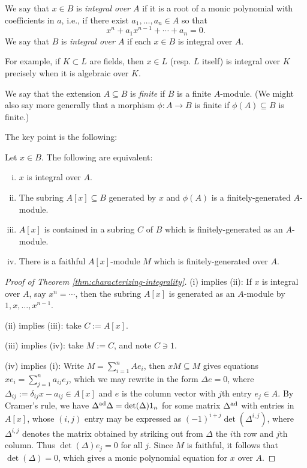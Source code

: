 \documentclass[reqno]{amsart}
\begin{document}
We say that \(x \in B\) is \emph{integral over $A$}
if it is a root of a monic polynomial with coefficients in \(a\),
i.e., if there exist \(a_1,\dotsc,a_n \in A\)
so that
\[
  x^n + a_1 x^{n-1} + \dotsb + a_n = 0.
  \]
We say that \(B\) is \emph{integral over $A$}
if each \(x \in B\) is integral over \(A\).

For example, if \(K \subset L\) are fields, then \(x \in L\)
(resp. \(L\) itself)
is integral
over \(K\) precisely when it is algebraic over \(K\).


We say that the extension \(A \subseteq B\) is \emph{finite} if \(B\) is a finite $A$-module.
(We might also say more generally that a morphism \(\phi : A \rightarrow B\) is finite
if \(\phi(A) \subseteq B\) is finite.)

The key point is the following:
\begin{theorem}\label{thm:characterizing-integrality}
  Let $x \in B$.
  The following are equivalent:
  \begin{enumerate}[(i)]
  \item $x$ is integral over $A$.
  \item The subring $A[x] \subseteq B$
    generated by $x$ and $\phi(A)$
    is a finitely-generated $A$-module.
  \item $A[x]$ is contained in a subring $C$ of $B$
    which is finitely-generated as an $A$-module.
  \item There is a faithful $A[x]$-module $M$
    which is finitely-generated over $A$.
  \end{enumerate}
\end{theorem}

\begin{proof}[Proof of Theorem \ref{thm:characterizing-integrality}]
  (i) implies (ii):
  If $x$ is integral over $A$,
  say $x^n = \dotsb$,
  then the subring $A[x]$ is generated
  as an $A$-module
  by $1, x, \dotsc, x^{n-1}$.

  (ii) implies (iii):
  take $C := A[x]$.

  (iii) implies (iv):
  take $M := C$, and note $C \ni 1$.

  (iv) implies (i):
  Write $M = \sum_{i=1}^n A e_i$,
  then $x M \subseteq M$ gives
  equations
  $x e_i = \sum_{j=1}^n a_{i j} e_j$,
  which we may rewrite in the form
  $\Delta e = 0$,
  where
  $\Delta_{i j} := \delta_{i j} x -  a_{i j} \in A[x]$
  and $e$ is the column vector with $j$th entry $e_j \in A$.
  By Cramer's rule, we have
  $\Delta^{\operatorname{ad}} \Delta = \det(\Delta) 1_n$
  for some matrix $\Delta^{\operatorname{ad}}$ with entries in $A[x]$,
  whose $(i,j)$ entry
  may be expressed as $(-1)^{i+j} \det (\Delta^{i,j})$,
  where $\Delta^{i,j}$ denotes the matrix obtained
  by striking out from $\Delta$ the $i$th row and $j$th column.
  Thus $\det(\Delta) e_j = 0$ for all $j$.
  Since $M$ is faithful,
  it follows that
  $\det(\Delta) = 0$, which gives a monic polynomial equation for $x$ over $A$.
\end{proof}
\end{document}
